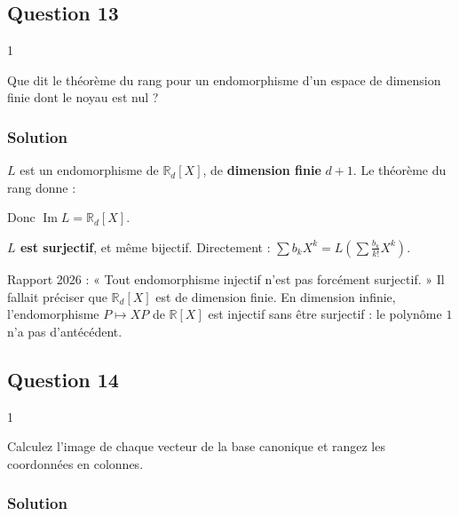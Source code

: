 \documentclass[11pt,a4paper]{article}
\newcommand{\equationajustee}[1]{%
  \sbox{\boiteequation}{$\displaystyle #1$}%
  \ifdim\wd\boiteequation>\linewidth
    \[\resizebox{\linewidth}{!}{\usebox{\boiteequation}}\]%
  \else
    \[#1\]%
  \fi}
\begin{document}
\hypertarget{question-13}{%
\subsection{Question 13}\label{question-13}}

\begin{indication}{1}

Que dit le théorème du rang pour un endomorphisme d'un espace de dimension finie dont le noyau est nul ?

\end{indication}

\hypertarget{solution-14}{%
\subsubsection{Solution}\label{solution-14}}

\(L\) est un endomorphisme de \(\mathbb R_d[X]\), de \textbf{dimension finie} \(d+1\). Le théorème du rang donne :

\equationajustee{\operatorname{rg}L=d+1-\dim\ker L=d+1 .}

Donc \(\operatorname{Im}L=\mathbb R_d[X]\).

\textbf{\(L\) est surjectif}, et même bijectif. Directement : \(\sum b_kX^k=L\left(\sum\frac{b_k}{k!}X^k\right)\).

\begin{piege}

Rapport 2026 : « Tout endomorphisme injectif n'est pas forcément surjectif. » Il fallait préciser que \(\mathbb R_d[X]\) est de dimension finie. En dimension infinie, l'endomorphisme \(P\mapsto XP\) de \(\mathbb R[X]\) est injectif sans être surjectif : le polynôme \(1\) n'a pas d'antécédent.

\end{piege}

\hypertarget{question-14}{%
\subsection{Question 14}\label{question-14}}

\begin{indication}{1}

Calculez l'image de chaque vecteur de la base canonique et rangez les coordonnées en colonnes.

\end{indication}

\hypertarget{solution-15}{%
\subsubsection{Solution}\label{solution-15}}
\end{document}
